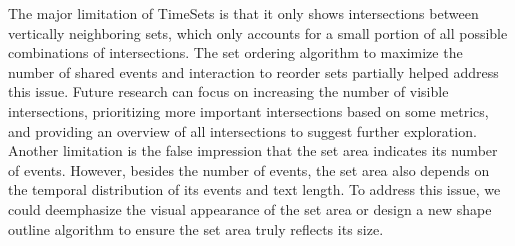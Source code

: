 The major limitation of TimeSets is that it only shows intersections between vertically neighboring sets, which only accounts for a small portion of all possible combinations of intersections. The set ordering algorithm to maximize the number of shared events and interaction to reorder sets partially helped address this issue. Future research can focus on increasing the number of visible intersections, prioritizing more important intersections based on some metrics, and providing an overview of all intersections to suggest further exploration. Another limitation is the false impression that the set area indicates its number of events. However, besides the number of events, the set area also depends on the temporal distribution of its events and text length. To address this issue, we could deemphasize the visual appearance of the set area or design a new shape outline algorithm to ensure the set area truly reflects its size.

%	
%	
%	


